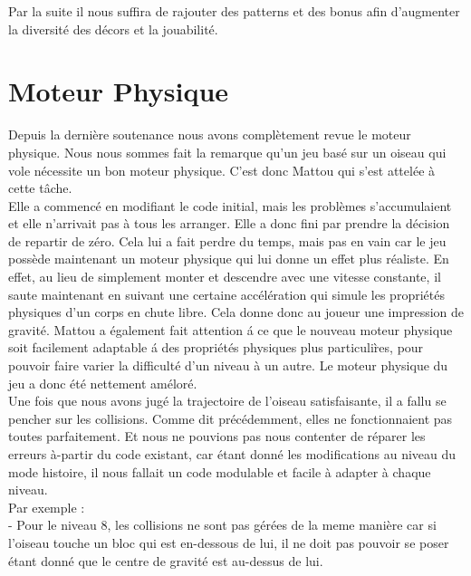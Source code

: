 \documentclass [11pt]{report}
\begin{document}
			Par la suite il nous suffira de rajouter des patterns et des bonus afin d'augmenter la diversité des décors et la jouabilité.
			
			\vspace{10mm}
			
\newpage
	\section{Moteur Physique}
		Depuis la dernière soutenance nous avons complètement revue le moteur physique. Nous nous sommes fait la remarque qu'un jeu bas\'e sur un oiseau qui vole nécessite un bon moteur physique. C'est donc Mattou qui s'est attelée \`a cette t\^ache. \\
		
		Elle a commencé en modifiant le code initial, mais les problèmes s'accumulaient et elle n'arrivait pas \`a tous les arranger. Elle a donc fini par prendre la décision de repartir de zéro. Cela lui a fait perdre du temps, mais pas en vain car le jeu possède maintenant un moteur physique qui lui donne un effet plus r\'ealiste. En effet, au lieu de simplement monter et descendre avec une vitesse constante, il saute maintenant en suivant une certaine accélération qui simule les propri\'et\'es physiques d'un corps en chute libre. Cela donne donc au joueur une impression de gravit\'e. Mattou a \'egalement fait attention \'a ce que le nouveau moteur physique soit facilement adaptable \'a des propri\'et\'es physiques plus particuli\`res, pour pouvoir faire varier la difficult\'e d'un niveau \`a un autre. Le moteur physique du jeu a donc \'et\'e nettement am\'elor\'e. \\
		
		\indent Une fois que nous avons jugé la trajectoire de l'oiseau satisfaisante, il a fallu se pencher sur les collisions. Comme dit précédemment, elles ne fonctionnaient pas toutes parfaitement. Et nous ne pouvions pas nous contenter de réparer les erreurs à-partir du code existant, car étant donné les modifications au niveau du mode histoire, il nous fallait un code modulable et facile à adapter à chaque niveau.\\
		
		\noindent Par exemple :\\
		\indent\indent - Pour le niveau 8, les collisions ne sont pas gérées de la meme manière car si l'oiseau touche un bloc qui est en-dessous de lui, il ne doit pas pouvoir se poser étant donné que le centre de gravité est au-dessus de lui.
		
\end{document}
